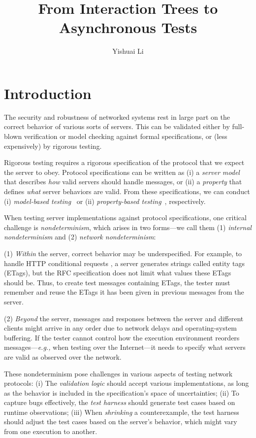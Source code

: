 \documentclass{article}
\title{From Interaction Trees to Asynchronous Tests}
\author{Yishuai Li}
\theoremstyle{definition}
\begin{document}
\maketitle
\section{Introduction}

The security and robustness of networked systems rest in large part on the
correct behavior of various sorts of servers.  This can be validated either by
full-blown verification or model checking against formal specifications, or
(less expensively) by rigorous testing.

Rigorous testing requires a rigorous specification of the protocol that we
expect the server to obey.  Protocol specifications can be written as (i) a {\em
  server model} that describes {\em how} valid servers should handle messages,
or (ii) a {\em property} that defines {\em what} server behaviors are valid.
From these specifications, we can conduct (i) {\em model-based
  testing}~\cite{broy2005model} or (ii) {\em property-based testing}~\cite{pbt},
respectively.

When testing server implementations against protocol specifications, one
critical challenge is {\em nondeterminism}, which arises in two forms---we call
them (1) {\em internal nondeterminism} and (2) {\em network nondeterminism}:

(1) {\em Within} the server, correct behavior may be \mbox{underspecified}.
For example, to handle HTTP conditional requests \cite{rfc7232}, a server
generates strings called entity tags (ETags), but the RFC specification does
not limit {what} values these ETags should be.  Thus, to create test
messages containing ETags, the tester must remember and reuse the ETags it
has been given in previous messages from the server.

(2) {\em Beyond} the server, messages and responses between the server and
different clients might arrive in any order due to network delays and
operating-system buffering.  If the tester cannot control how the execution
environment reorders messages---{\it e.g.,} when testing over the Internet---it
needs to specify what servers are valid as observed over the network.

These nondeterminism pose challenges in various aspects of testing network
protocols: (i) The {\em validation logic} should accept various implementations,
as long as the behavior is included in the specification's space of
uncertainties; (ii) To capture bugs effectively, the {\em test harness} should
generate test cases based on runtime observations; (iii) When {\em shrinking} a
counterexample, the test harness should adjust the test cases based on the
server's behavior, which might vary from one execution to another.
\end{document}
